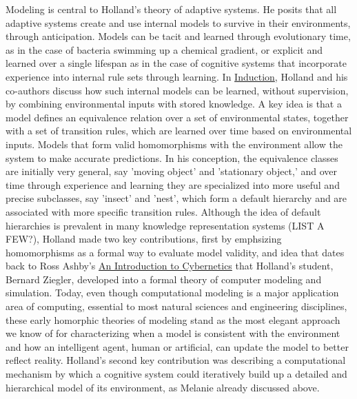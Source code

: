 \documentclass{sig-alternate}
\begin{document}
Modeling is central to Holland's theory of adaptive systems.  He posits that all adaptive systems create and use internal models to survive in their environments, through anticipation.  Models can be tacit and learned through evolutionary time, as in the case of bacteria swimming up a chemical gradient, or explicit and learned over a single lifespan as in the case of cognitive systems that incorporate experience into internal rule sets through learning.  In \underline{Induction}, Holland and his co-authors discuss how such internal models can be learned, without supervision, by combining environmental inputs with stored knowledge.  A key idea is that a model defines an equivalence relation over a set of environmental states, together with a set of transition rules, which are learned over time based on environmental inputs.  Models that form valid homomorphisms with the environment allow the system to make accurate predictions.  In his conception, the equivalence classes are initially very general, say 'moving object' and 'stationary object,' and over time through experience and learning they are specialized into more useful and precise subclasses, say 'insect' and 'nest', which form a default hierarchy and are associated with more specific transition rules.  Although the idea of default hierarchies is prevalent in many knowledge representation systems (LIST A FEW?), Holland made two key contributions, first by emphsizing homomorphisms as a formal way to evaluate model validity, and idea that dates back to Ross Ashby's \underline{An Introduction to Cybernetics} that Holland's student, Bernard Ziegler, developed into a formal theory of computer modeling and simulation.  Today, even though computational modeling is a major application area of computing,  essential to most natural sciences and engineering disciplines, these early homorphic theories of modeling stand as the most elegant approach we know of for characterizing when a model is consistent with the environment and how an intelligent agent, human or artificial, can update the model to better reflect reality.
Holland's second key contribution was describing a computational mechanism by which a cognitive system could iteratively build up a detailed and hierarchical model of its environment, as Melanie already discussed above.
\end{document}

